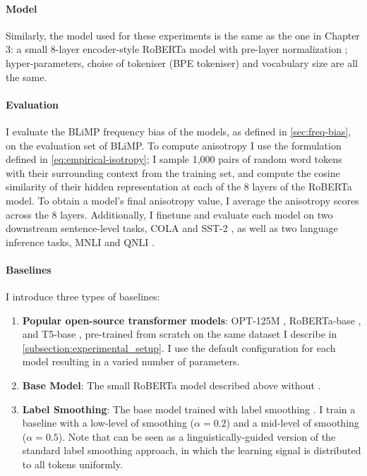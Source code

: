 \paragraph{Model} Similarly, the model used for these experiments is the same as the one in Chapter 3: a small 8-layer encoder-style RoBERTa model with pre-layer normalization \cite{huebner2021babyberta}; hyper-parameters, choise of tokeniser (BPE tokeniser) and vocabulary size are all the same. 

\paragraph{Evaluation} I evaluate the BLiMP frequency bias of the models, as defined in \cref{sec:freq-bias}, on the evaluation set of BLiMP. To compute anisotropy I use the formulation defined in \cref{eq:empirical-isotropy}; I sample 1,000 pairs of random word tokens with their surrounding context from the training set, and compute the cosine similarity of their hidden representation at each of the 8 layers of the RoBERTa model. To obtain a model's final anisotropy value, I average the anisotropy scores across the 8 layers. Additionally, I finetune and evaluate each model on two downstream sentence-level tasks, COLA \citep{warstadt2019cola} and SST-2 \citep{socher2013sst}, as well as two language inference tasks, MNLI \citep{williams2018mnli} and QNLI \citep{rajpurkar2016squad, wang2018glue}.


\paragraph{Baselines}

I introduce three types of baselines: 
\begin{enumerate}
    \item \textbf{Popular open-source transformer models}: OPT-125M \citep{zhang2022opt}, RoBERTa-base \citep{liu2019roberta}, and T5-base \citep{raffel2020t5}, pre-trained from scratch on the same dataset I describe in \cref{subsection:experimental_setup}. I use the default configuration for each model resulting in a varied number of parameters.
    \item \textbf{Base Model}: The small RoBERTa model described above without \smoothing.
    \item \textbf{Label Smoothing}: The base model trained with label smoothing \citep{szegedy2016rethinking}. I train a baseline with a low-level of smoothing ($\alpha=0.2$) and a mid-level of smoothing ($\alpha=0.5$). Note that \smoothing can be seen as a linguistically-guided version of the standard label smoothing approach, in which the learning signal is distributed to all tokens uniformly.
\end{enumerate}


